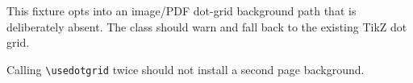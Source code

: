 \documentclass{studentnotes}
\begin{document}

\makenotetitle

This fixture opts into an image/PDF dot-grid background path that is deliberately
absent. The class should warn and fall back to the existing TikZ dot grid.

Calling \verb|\usedotgrid| twice should not install a second page background.
\end{document}

